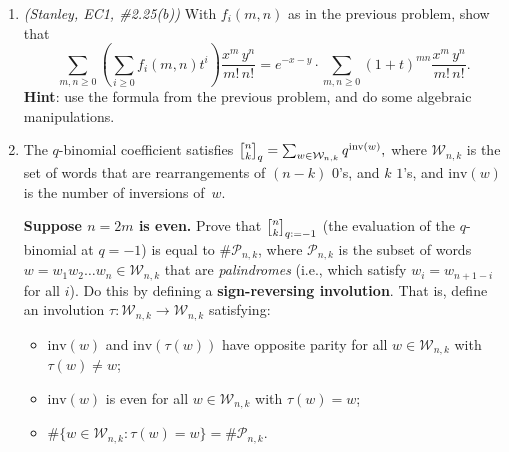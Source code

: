 \documentclass[11pt]{article}
\begin{document}
\begin{enumerate}
\item \emph{(Stanley, EC1, \#2.25(b))} With $f_i(m,n)$ as in the previous problem, show that
\[ \sum_{m,n \geq 0} \left(\sum_{i \geq 0} f_i(m,n) t^i \right) \frac{x^m \, y^n} {m! \, n!} = e^{-x-y} \cdot \sum_{m,n \geq 0}  (1+t)^{mn}  \frac{x^m \, y^n} {m! \, n!} .\]
{\bf Hint}: use the formula from the previous problem, and do some algebraic manipulations.


\renewcommand{\binom}{\genfrac{(}{)}{0pt}{}}
\DeclareRobustCommand{\qbinom}{\genfrac{\lbrack}{\rbrack}{0pt}{}}

\item The $q$-binomial coefficient satisfies $\qbinom{n}{k}_q = \sum_{w \in \mathcal{W}_{n,k}} q^{\mathrm{inv}(w)},$ where $\mathcal{W}_{n,k}$ is the set of words that are rearrangements of $(n-k)$ $0$'s, and $k$ $1$'s, and $\mathrm{inv}(w)$ is the number of inversions of~$w$.

{\bf Suppose $n=2m$ is even.} Prove that $\qbinom{n}{k}_{q := -1}$ (the evaluation of the $q$-binomial at $q=-1$) is equal to $\#\mathcal{P}_{n,k}$, where $\mathcal{P}_{n,k}$ is the subset of words $w=w_1w_2\ldots w_{n} \in \mathcal{W}_{n,k}$ that are \emph{palindromes} (i.e., which satisfy $w_i = w_{n+1-i}$ for all $i$). Do this by defining a {\bf sign-reversing involution}. That is, define an involution $\tau\colon \mathcal{W}_{n,k}\to \mathcal{W}_{n,k}$ satisfying:
\begin{itemize}
\item $\mathrm{inv}(w)$ and $\mathrm{inv}(\tau(w))$ have opposite parity for all $w\in \mathcal{W}_{n,k}$ with $\tau(w)\neq w$;
\item $\mathrm{inv}(w)$ is even for all $w\in \mathcal{W}_{n,k}$ with $\tau(w)=w$;
\item $\#\{w\in \mathcal{W}_{n,k}\colon \tau(w)=w\} = \#\mathcal{P}_{n,k}$.
\end{itemize}

\end{enumerate}
\end{document}
